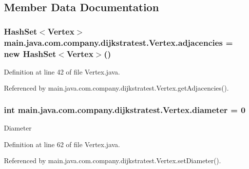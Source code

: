 \subsection{Member Data Documentation}
\hypertarget{classmain_1_1java_1_1com_1_1company_1_1dijkstratest_1_1_vertex_acb5df443c451a3c4f11b48b4fd5a7c46}{
\subsubsection[{adjacencies}]{\setlength{\rightskip}{0pt plus 5cm}Hash\-Set$<${\bf Vertex}$>$ main.\-java.\-com.\-company.\-dijkstratest.\-Vertex.\-adjacencies = new Hash\-Set$<${\bf Vertex}$>$()\hspace{0.3cm}{\ttfamily [private]}}}\label{classmain_1_1java_1_1com_1_1company_1_1dijkstratest_1_1_vertex_acb5df443c451a3c4f11b48b4fd5a7c46}


Definition at line 42 of file Vertex.\-java.



Referenced by main.\-java.\-com.\-company.\-dijkstratest.\-Vertex.\-get\-Adjacencies().

\hypertarget{classmain_1_1java_1_1com_1_1company_1_1dijkstratest_1_1_vertex_af5f0b296f64910fb629a69b8e39b6498}{
\subsubsection[{diameter}]{\setlength{\rightskip}{0pt plus 5cm}int main.\-java.\-com.\-company.\-dijkstratest.\-Vertex.\-diameter = 0\hspace{0.3cm}{\ttfamily [private]}}}\label{classmain_1_1java_1_1com_1_1company_1_1dijkstratest_1_1_vertex_af5f0b296f64910fb629a69b8e39b6498}
Diameter 

Definition at line 62 of file Vertex.\-java.



Referenced by main.\-java.\-com.\-company.\-dijkstratest.\-Vertex.\-set\-Diameter().

